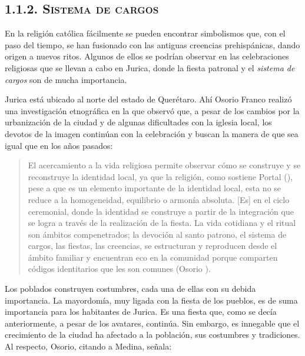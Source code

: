 \documentclass[14pt,letterpaper,twoside]{extbook} %
\begin{document}
\subsection*{\mdseries\large\textsc{1.1.2. Sistema de cargos}}

\noindent En la religión católica fácilmente se pueden encontrar simbolismos que, con el paso del tiempo, se han fusionado con las antiguas creencias prehispánicas, dando origen a nuevos ritos. Algunos de ellos se podrían observar en las celebraciones religiosas que se llevan a cabo en Jurica, donde la fiesta patronal y el \textit{sistema de cargos} son de mucha importancia.

Jurica está ubicado al norte del estado de Querétaro. Ahí Osorio Franco realizó una investigación etnográfica en la que observó que, a pesar de los cambios por la urbanización de la ciudad y de algunas dificultades con la iglesia local, los devotos de la imagen continúan con la celebración y buscan la manera de que sea igual que en los años pasados:

\begin{quotation}
\noindent El acercamiento a la vida religiosa permite observar cómo se construye y se reconstruye la identidad local, ya que la religión, como sostiene Portal (), pese a que es un elemento importante de la identidad local, esta no se reduce a la homogeneidad, equilibrio o armonía absoluta. [Es] en el ciclo ceremonial, donde la identidad se construye a partir de la integración que se logra a través de la realización de la fiesta. La vida cotidiana y el ritual son ámbitos compenetrados; la devoción al santo patrono, el sistema de cargos, las fiestas, las creencias, se estructuran y reproducen desde el ámbito familiar y encuentran eco en la comunidad porque comparten códigos identitarios que les son comunes (Osorio ).
\end{quotation}

\noindent Los poblados construyen costumbres, cada una de ellas con su debida importancia. La mayordomía, muy ligada con la fiesta de los pueblos, es de suma importancia para los habitantes de Jurica. Es una fiesta que, como se decía anteriormente, a pesar de los avatares, continúa. Sin embargo, es innegable que el crecimiento de la ciudad ha afectado a la población, sus costumbres y tradiciones. Al respecto, Osorio, citando a Medina, señala:
\end{document}
